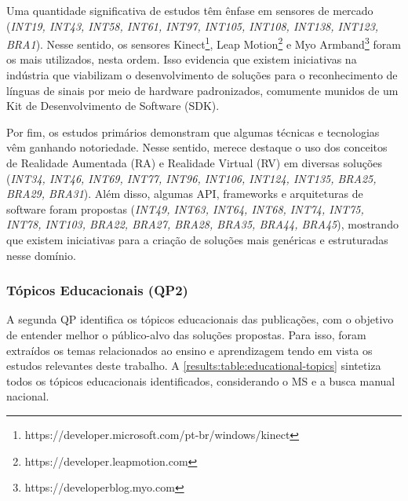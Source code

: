 Uma quantidade significativa de estudos têm ênfase em sensores de mercado (\textit{INT19, INT43, INT58, INT61, INT97, INT105, INT108, INT138, INT123, BRA1}). Nesse sentido, os sensores Kinect\footnote{https://developer.microsoft.com/pt-br/windows/kinect}, Leap Motion\footnote{https://developer.leapmotion.com} e Myo Armband\footnote{https://developerblog.myo.com} foram os mais utilizados, nesta ordem. Isso evidencia que existem iniciativas na indústria que viabilizam o desenvolvimento de soluções para o reconhecimento de línguas de sinais por meio de hardware padronizados, comumente munidos de um Kit de Desenvolvimento de Software (SDK).

Por fim, os estudos primários demonstram que algumas técnicas e tecnologias vêm ganhando notoriedade. Nesse sentido, merece destaque o uso dos conceitos de Realidade Aumentada (RA) e Realidade Virtual (RV) em diversas soluções (\textit{INT34, INT46, INT69, INT77, INT96, INT106, INT124, INT135, BRA25, BRA29, BRA31}). Além disso, algumas API, frameworks e arquiteturas de software foram propostas (\textit{INT49, INT63, INT64, INT68, INT74, INT75, INT78, INT103, BRA22, BRA27, BRA28, BRA35, BRA44, BRA45}), mostrando que existem iniciativas para a criação de soluções mais genéricas e estruturadas nesse domínio.

\subsubsection{Tópicos Educacionais (QP2)}

A segunda QP identifica os tópicos educacionais das publicações, com o objetivo de entender melhor o público-alvo das soluções propostas. Para isso, foram extraídos os temas relacionados ao ensino e aprendizagem tendo em vista os estudos relevantes deste trabalho. A \autoref{results:table:educational-topics} sintetiza todos os tópicos educacionais identificados, considerando o MS e a busca manual nacional.

